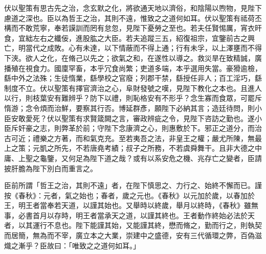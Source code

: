 \begin{pinyinscope}
 伏以聖策有思古先之治，念玄默之化，將欲通天地以濟俗，和陰陽以煦物，見陛下慮道之深也。臣以為哲王之治，其則不遠，惟致之之道何如耳。伏以聖策有祗荷丕構而不敢荒寧，奉若謨訓而罔有怠忽，見陛下憂勞之至也。若夫任賢惕厲，宵衣旰食，宜絀左右之纖佞，進股肱之大臣。若夫追蹤三五，紹復祖宗，宜鑒前古之興亡，明當代之成敗。心有未達，以下情蔽而不得上通；行有未孚，以上澤壅而不得下浹。欲人之化，在脩己以先之；欲氣之和，在遂性以導之。救災旱在致精誠，廣播殖在視食力。國廩罕畜，本乎冗食尚繁；吏道多端，本乎選用失當。豪猾逾檢，繇中外之法殊；生徒惰業，繇學校之官廢；列郡干禁，繇授任非人；百工淫巧，繇制度不立。伏以聖策有擇官濟治之心，阜財發號之嘆，見陛下教化之本也。且進人以行，則枝葉安有難辨乎？防下以禮，則恥格安有不形乎？念生寡而食眾，可罷斥惰游；念令煩而治鮮，要察其行否。博延群彥，願陛下必納其言；造廷待問，則小臣安敢愛死？伏以聖策有求賢箴闕之言，審政辨疵之令，見陛下咨訪之勤也。遂小臣斥奸豪之志，則弊革於前；守陛下念康濟之心，則惠敷於下。邪正之道分，而治古可近；禮樂之方著，而和氣克充。至若夷吾之法，非皇王之權；嚴尤所陳，無最上之策；元凱之所先，不若唐堯考績；叔子之所務，不若虞舜舞干。且非大德之中庸、上聖之龜鑒，又何足為陛下道之哉？或有以系安危之機、兆存亡之變者，臣請披肝膽為陛下別白而重言之。



 臣前所謂「哲王之治，其則不遠」者，在陛下慎思之、力行之、始終不懈而已。謹按《春秋》：元者，氣之始也；春者，歲之元也。《春秋》以元加於歲，以春加於王，明王者當奉若天道，以謹其始也。又舉時以終歲，舉月以終時，《春秋》雖無事，必書首月以存時，明王者當承天之道，以謹其終也。王者動作終始必法於天者，以其運行不息也。陛下能謹其始，又能謹其終，懋而脩之，勤而行之，則執契而居簡，無為而不宰，廣立本之大業，崇建中之盛德，安有三代循環之弊，百偽滋熾之漸乎？臣故曰：「唯致之之道何如耳。」




\end{pinyinscope}

